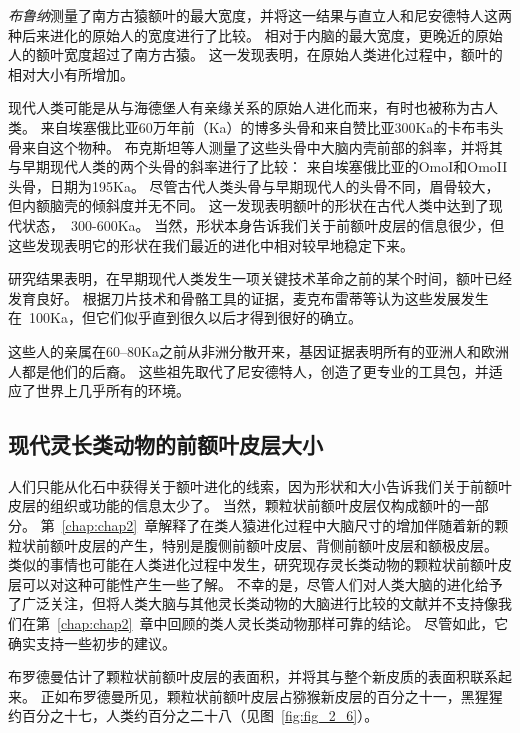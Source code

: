 \textit{布鲁纳}\cite{bruner2010bivariate}测量了南方古猿额叶的最大宽度，并将这一结果与直立人和尼安德特人这两种后来进化的原始人的宽度进行了比较。
相对于内脑的最大宽度，更晚近的原始人的额叶宽度超过了南方古猿。
这一发现表明，在原始人类进化过程中，额叶的相对大小有所增加。
\par


现代人类可能是从与海德堡人有亲缘关系的原始人进化而来，有时也被称为古人类。
来自埃塞俄比亚60万年前（Ka）的博多头骨和来自赞比亚300Ka\cite{conroy2000endocranial}的卡布韦头骨来自这个物种。
布克斯坦等人\cite{bookstein1999comparing}测量了这些头骨中大脑内壳前部的斜率，并将其与早期现代人类的两个头骨的斜率进行了比较：
来自埃塞俄比亚的OmoI和OmoII头骨，日期为195Ka\cite{day1969omo}。
尽管古代人类头骨与早期现代人的头骨不同，眉骨较大，但内额脑壳的倾斜度并无不同。
这一发现表明额叶的形状在古代人类中达到了现代状态，~300-600Ka。
当然，形状本身告诉我们关于前额叶皮层的信息很少，但这些发现表明它的形状在我们最近的进化中相对较早地稳定下来。
\par


研究结果表明，在早期现代人类发生一项关键技术革命之前的某个时间，额叶已经发育良好。
根据刀片技术和骨骼工具的证据，麦克布雷蒂等\cite{mcbrearty2000revolution}认为这些发展发生在~100Ka，但它们似乎直到很久以后才得到很好的确立。
\par


这些人的亲属在60–80Ka之前从非洲分散开来\cite{mellars2006did}，基因证据表明所有的亚洲人和欧洲人都是他们的后裔。
这些祖先取代了尼安德特人，创造了更专业的工具包，并适应了世界上几乎所有的环境。



\subsection{现代灵长类动物的前额叶皮层大小}

人们只能从化石中获得关于额叶进化的线索，因为形状和大小告诉我们关于前额叶皮层的组织或功能的信息太少了。
当然，颗粒状前额叶皮层仅构成额叶的一部分。
第~\ref{chap:chap2}~章解释了在类人猿进化过程中大脑尺寸的增加伴随着新的颗粒状前额叶皮层的产生，特别是腹侧前额叶皮层、背侧前额叶皮层和额极皮层。
类似的事情也可能在人类进化过程中发生，研究现存灵长类动物的颗粒状前额叶皮层可以对这种可能性产生一些了解。
不幸的是，尽管人们对人类大脑的进化给予了广泛关注，但将人类大脑与其他灵长类动物的大脑进行比较的文献并不支持像我们在第~\ref{chap:chap2}~章中回顾的类人灵长类动物那样可靠的结论。
尽管如此，它确实支持一些初步的建议。
\par


布罗德曼\cite{brodmann1912neue}估计了颗粒状前额叶皮层的表面积，并将其与整个新皮质的表面积联系起来。
正如布罗德曼所见，颗粒状前额叶皮层占猕猴新皮层的百分之十一，黑猩猩约百分之十七，人类约百分之二十八（见图~\ref{fig:fig_2_6}）。
\par


